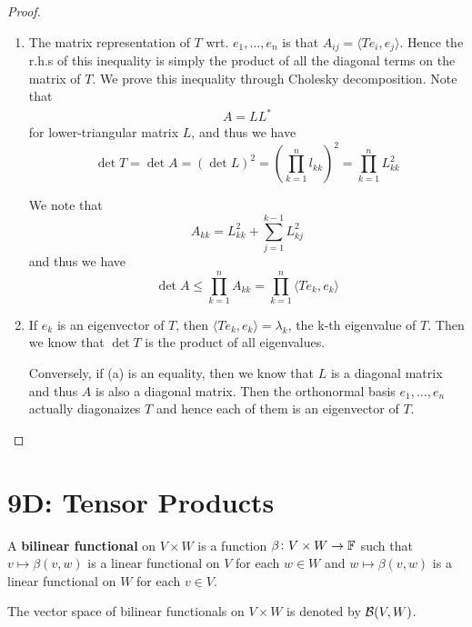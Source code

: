\documentclass{extarticle}
\begin{document}
\begin{proof}
\begin{enumerate}[label=(\alph*)]
    \item The matrix representation of \(T\) wrt. \(e_1, \ldots, e_n\) is that 
    \(A_{ij} = \langle Te_i, e_j \rangle\). Hence the r.h.s of this inequality is simply 
    the product of all the diagonal terms on the matrix of \(T\). We prove this inequality 
    through Cholesky decomposition. Note that 
    \begin{align*}
        A = L L^*
    \end{align*}
    for lower-triangular matrix \(L\), and thus we have 
    \[\det T = \det A = (\det L)^2 = \left( \prod_{k=1}^{n} l_{kk} \right)^2 = \prod_{k=1}^{n}L_{kk}^2\]

    We note that 
    \[A_{kk} = L_{kk}^2 + \sum_{j=1}^{k-1} L_{kj}^2  \]
    and thus we have 
    \[\det A \leq \prod_{k=1}^{n}A_{kk} = \prod_{k=1}^{n} \langle Te_k,e_k \rangle\]
    
    
    
    \item  If \(e_k\) is an eigenvector of \(T\), then \(\langle Te_k, e_k \rangle = \lambda_k\), the 
    k-th eigenvalue of \(T\). Then we know that \(\det T \) is the product of all eigenvalues. 

    Conversely, if (a) is an equality, then we know that \(L\) is a diagonal matrix and thus 
    \(A\) is also a diagonal matrix. Then the orthonormal basis \(e_1, \ldots, e_n\) actually 
    diagonaizes \(T\) and hence each of them is an eigenvector of \(T\).
\end{enumerate}
\end{proof}




\newpage 
\section*{9D: Tensor Products}

\begin{definition}
    A \textbf{bilinear functional} on \(V \times W\) is a function  \(\beta \colon V \times W \to \mathbb{F}\)
    such that \(v \mapsto \beta(v, w)\) is a linear functional on \(V\) for each \(w \in W\) and 
    \(w \mapsto \beta(v, w)\) is a linear functional on \(W\) for each \(v \in V\). 

    The vector space of bilinear functionals on \(V \times W\) is denoted by \(\mathcal{B}(V, W)\). 
\end{definition}
\end{document}
